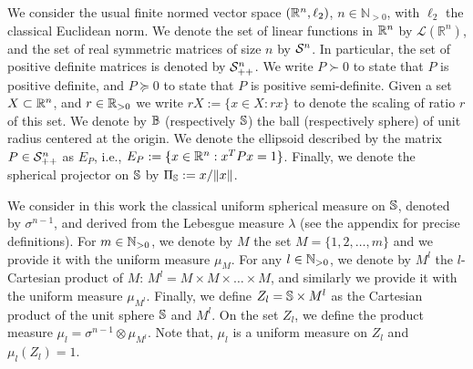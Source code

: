 We consider the usual finite normed vector space $(\mathbb{R}^n,\ell_2)$, $n \in \mathbb{N}_{> 0}$, with $\ell_2$ the classical Euclidean norm. We denote the set of linear functions in $\mathbb{R}^n$ by $\mathcal{L}(\mathbb{R}^n)$, and the set of real symmetric matrices of size $n$ by $\mathcal{S}^n$. In particular, the set of positive definite matrices is denoted by $\mathcal{S}^n_{++}$. We write $P \succ 0$ to state that $P$ is positive definite, and $P \succeq 0$ to state that $P$ is positive semi-definite. Given a set $X \subset \mathbb{R}^n$, and $r \in \mathbb{R}_{> 0}$ we write \mbox{$rX := \{x \in X : rx\}$} to denote the scaling of ratio $r$ of this set. We denote by $\mathbb{B}$ (respectively $\mathbb{S}$) the ball (respectively sphere) of unit radius centered at the origin.  We denote the ellipsoid described by the matrix $P \in \mathcal{S}^n_{++}$ as $E_P$, i.e., $E_P:= \{x \in \mathbb{R}^n: x^TPx = 1\}$. Finally, we denote the spherical projector on $\mathbb{S}$ by $\Pi_{\mathbb{S}} := x/\Vert x\Vert$. %



\noindent
We consider in this work the classical uniform spherical measure on $\mathbb{S}$, denoted by $\sigma^{n-1}$, and derived from the Lebesgue measure $\lambda$ (see the appendix for precise definitions). For $m \in \mathbb{N}_{>0}$, we denote by $M$ the set $M=\{1,2, \ldots,m \}$ and we provide it with the uniform measure $\mu_M$. For any $l \in \mathbb{N}_{>0}$, we denote by $M^l$ the $l$-Cartesian product of $M$: $M^l = M \times M \times \ldots \times M$, and similarly we provide it with the uniform measure $\mu_{M^l}$. Finally, we define $Z_l = \mathbb{S} \times M^l$ as the Cartesian product of the unit sphere $\mathbb{S}$ and $M^l$. On the set $Z_l$, we define the product measure $\mu_l = \sigma^{n-1} \otimes \mu_{M^l}$. Note that, $\mu_l$ is a uniform measure on $Z_l$ and $\mu_l(Z_l)=1$.  


